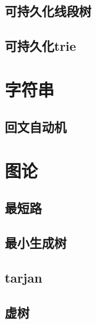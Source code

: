 \documentclass[UTF8,a4paper]{ctexart}
\begin{document}
\subsection{可持久化线段树}

\subsection{可持久化trie}

\section{字符串}











\subsection{回文自动机}

\section{图论}

\subsection{最短路}

\subsection{最小生成树}





\subsection{tarjan}

\subsection{虚树}
\end{document}
